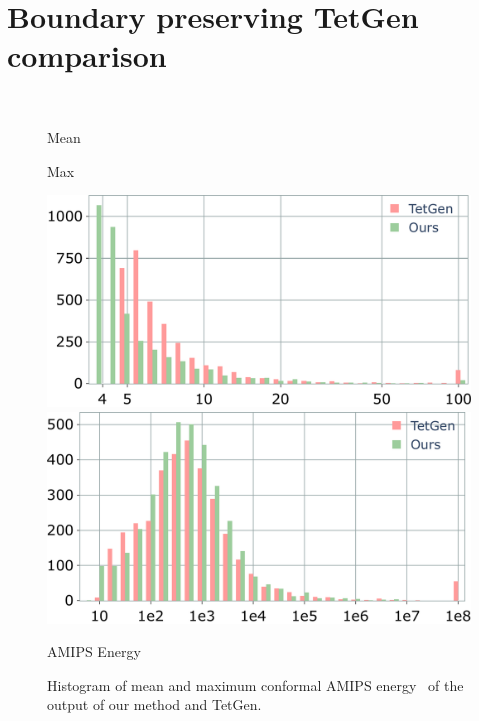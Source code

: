 \section{Boundary preserving TetGen comparison}\label{app:tetgen}

\begin{figure}
    \centering
    \parbox{0.02\linewidth}{~}\hfill\hfill
    \parbox{.47\linewidth}{\centering Mean}\hfill
    \parbox{.47\linewidth}{\centering Max}\par
    \parbox{0.02\linewidth}{\centering{}}\hfill\hfill
    \parbox{.47\linewidth}{\includegraphics[width=\linewidth]{curve_meshing_in_shell_tex/figs/stats/tetgen_meanE}}\hfill
    \parbox{.47\linewidth}{\includegraphics[width=\linewidth]{curve_meshing_in_shell_tex/figs/stats/tetgen_maxE}}\par
     \scriptsize{AMIPS Energy}
    \caption{Histogram of mean and maximum conformal AMIPS energy~\cite{Rabinovich:2017} of the output of our method and TetGen.}
    \label{bichon:fig:energy-max-avg}
\end{figure}

